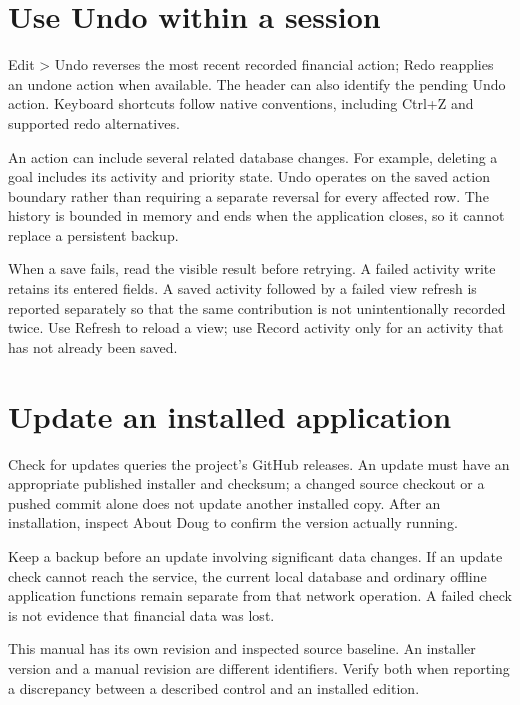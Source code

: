 \section{Use Undo within a session}
Edit > Undo reverses the most recent recorded financial action; Redo reapplies an undone action when available. The header can also identify the pending Undo action. Keyboard shortcuts follow native conventions, including Ctrl+Z and supported redo alternatives.

An action can include several related database changes. For example, deleting a goal includes its activity and priority state. Undo operates on the saved action boundary rather than requiring a separate reversal for every affected row. The history is bounded in memory and ends when the application closes, so it cannot replace a persistent backup.

When a save fails, read the visible result before retrying. A failed activity write retains its entered fields. A saved activity followed by a failed view refresh is reported separately so that the same contribution is not unintentionally recorded twice. Use Refresh to reload a view; use Record activity only for an activity that has not already been saved.

\section{Update an installed application}
Check for updates queries the project's GitHub releases. An update must have an appropriate published installer and checksum; a changed source checkout or a pushed commit alone does not update another installed copy. After an installation, inspect About Doug to confirm the version actually running.

Keep a backup before an update involving significant data changes. If an update check cannot reach the service, the current local database and ordinary offline application functions remain separate from that network operation. A failed check is not evidence that financial data was lost.

This manual has its own revision and inspected source baseline. An installer version and a manual revision are different identifiers. Verify both when reporting a discrepancy between a described control and an installed edition.

